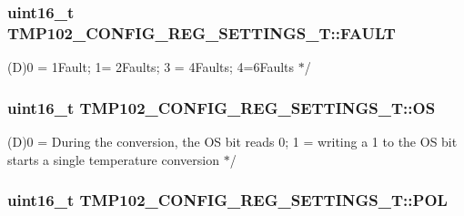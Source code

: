 \subsubsection[{\texorpdfstring{F\+A\+U\+LT}{FAULT}}]{\setlength{\rightskip}{0pt plus 5cm}uint16\+\_\+t T\+M\+P102\+\_\+\+C\+O\+N\+F\+I\+G\+\_\+\+R\+E\+G\+\_\+\+S\+E\+T\+T\+I\+N\+G\+S\+\_\+\+T\+::\+F\+A\+U\+LT}\hypertarget{structTMP102__CONFIG__REG__SETTINGS__T_a6c73d5cc6105f5afd1dbb33454705ec3}{}\label{structTMP102__CONFIG__REG__SETTINGS__T_a6c73d5cc6105f5afd1dbb33454705ec3}

\begin{DoxyItemize}
\item (D)0 = 1\+Fault; 1= 2\+Faults; 3 = 4\+Faults; 4=6\+Faults $\ast$/ 
\end{DoxyItemize}
\subsubsection[{\texorpdfstring{OS}{OS}}]{\setlength{\rightskip}{0pt plus 5cm}uint16\+\_\+t T\+M\+P102\+\_\+\+C\+O\+N\+F\+I\+G\+\_\+\+R\+E\+G\+\_\+\+S\+E\+T\+T\+I\+N\+G\+S\+\_\+\+T\+::\+OS}\hypertarget{structTMP102__CONFIG__REG__SETTINGS__T_a09870f580e0e800f3eb23f640f07a3c3}{}\label{structTMP102__CONFIG__REG__SETTINGS__T_a09870f580e0e800f3eb23f640f07a3c3}

\begin{DoxyItemize}
\item (D)0 = During the conversion, the OS bit reads \textquotesingle{}0\textquotesingle{}; 1 = writing a 1 to the OS bit starts a single temperature conversion $\ast$/ 
\end{DoxyItemize}
\subsubsection[{\texorpdfstring{P\+OL}{POL}}]{\setlength{\rightskip}{0pt plus 5cm}uint16\+\_\+t T\+M\+P102\+\_\+\+C\+O\+N\+F\+I\+G\+\_\+\+R\+E\+G\+\_\+\+S\+E\+T\+T\+I\+N\+G\+S\+\_\+\+T\+::\+P\+OL}\hypertarget{structTMP102__CONFIG__REG__SETTINGS__T_a2225a8d1e41436fe30577b474c99c737}{}\label{structTMP102__CONFIG__REG__SETTINGS__T_a2225a8d1e41436fe30577b474c99c737}

